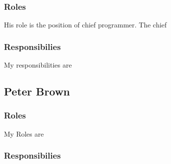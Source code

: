 
\subsubsection{Roles}

	His role is the position of chief programmer. The chief


\subsubsection{Responsibilies}

	My responsibilities are


\subsection{Peter Brown}


\subsubsection{Roles}

	My Roles are


\subsubsection{Responsibilies}

